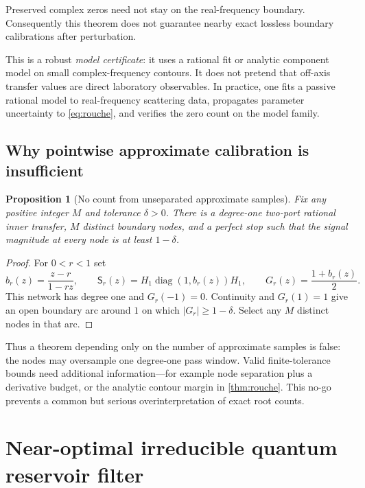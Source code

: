 \documentclass[11pt]{article}
\newtheorem{proposition}[theorem]{Proposition}
\theoremstyle{definition}
\theoremstyle{remark}
\newcommand{\diag}{\operatorname{diag}}
\begin{document}
Preserved complex zeros need not stay on the real-frequency boundary.
Consequently this theorem does not guarantee nearby exact lossless boundary
calibrations after perturbation.

This is a robust \emph{model certificate}: it uses a rational fit or analytic
component model on small complex-frequency contours.  It does not pretend
that off-axis transfer values are direct laboratory observables.  In
practice, one fits a passive rational model to real-frequency scattering
data, propagates parameter uncertainty to \eqref{eq:rouche}, and verifies the
zero count on the model family.

\subsection{Why pointwise approximate calibration is insufficient}

\begin{proposition}[No count from unseparated approximate samples]
\label{prop:approxnogo}
Fix any positive integer $M$ and tolerance $\delta>0$.
There is a degree-one two-port rational inner transfer, $M$ distinct boundary
nodes, and a perfect stop such that the signal magnitude at every node is at
least $1-\delta$.
\end{proposition}

\begin{proof}
For $0<r<1$ set
\[
 b_r(z)=\frac{z-r}{1-rz},\qquad
 \mathsf S_r(z)=H_1\diag(1,b_r(z))H_1,
 \qquad G_r(z)=\frac{1+b_r(z)}2.
\]
This network has degree one and $G_r(-1)=0$.  Continuity and $G_r(1)=1$ give
an open boundary arc around $1$ on which $|G_r|\geq1-\delta$.  Select any $M$
distinct nodes in that arc.
\end{proof}

Thus a theorem depending only on the number of approximate samples is false:
the nodes may oversample one degree-one pass window.  Valid finite-tolerance
bounds need additional information---for example node separation plus a
derivative budget, or the analytic contour margin in \cref{thm:rouche}.  This
no-go prevents a common but serious overinterpretation of exact root counts.

\section{Near-optimal irreducible quantum reservoir filter}
\label{sec:irreducible}
\end{document}

